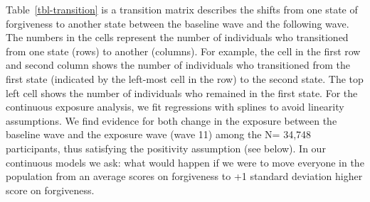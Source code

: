 \documentclass[
  singlecolumn]{report}
\begin{document}
Table~\ref{tbl-transition} is a transition matrix describes the shifts
from one state of forgiveness to another state between the baseline wave
and the following wave. The numbers in the cells represent the number of
individuals who transitioned from one state (rows) to another (columns).
For example, the cell in the first row and second column shows the
number of individuals who transitioned from the first state (indicated
by the left-most cell in the row) to the second state. The top left cell
shows the number of individuals who remained in the first state. For the
continuous exposure analysis, we fit regressions with splines to avoid
linearity assumptions. We find evidence for both change in the exposure
between the baseline wave and the exposure wave (wave 11) among the N=
34,748 participants, thus satisfying the positivity assumption (see
below). In our continuous models we ask: what would happen if we were to
move everyone in the population from an average scores on forgiveness to
+1 standard deviation higher score on forgiveness.
\end{document}
